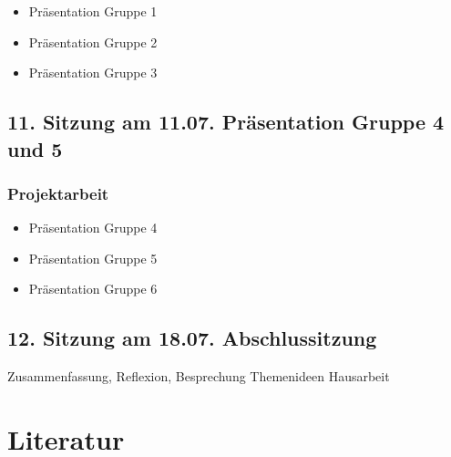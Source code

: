 \documentclass[
  ngerman,
]{article}
\providecommand{\tightlist}{%
  \setlength{\itemsep}{0pt}\setlength{\parskip}{0pt}}
\begin{document}
\begin{itemize}
\tightlist
\item
  Präsentation Gruppe 1
\item
  Präsentation Gruppe 2
\item
  Präsentation Gruppe 3
\end{itemize}

\hypertarget{sitzung-am-11.07.-pruxe4sentation-gruppe-4-und-5}{%
\subsection*{11. Sitzung am 11.07. \textbar{} Präsentation Gruppe 4 und 5}\label{sitzung-am-11.07.-pruxe4sentation-gruppe-4-und-5}}

\hypertarget{projektarbeit-8}{%
\subsubsection*{Projektarbeit}\label{projektarbeit-8}}

\begin{itemize}
\tightlist
\item
  Präsentation Gruppe 4
\item
  Präsentation Gruppe 5
\item
  Präsentation Gruppe 6
\end{itemize}

\hypertarget{sitzung-am-18.07.-abschlussitzung}{%
\subsection*{12. Sitzung am 18.07. \textbar{} Abschlussitzung}\label{sitzung-am-18.07.-abschlussitzung}}

Zusammenfassung, Reflexion, Besprechung Themenideen Hausarbeit

\hypertarget{literatur}{%
\section*{Literatur}\label{literatur}}
\end{document}
